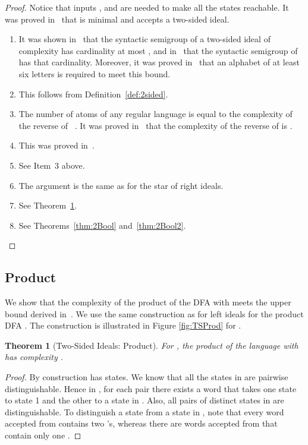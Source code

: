 \documentclass[final]{dmtcs-episciences}
\newcommand{\be}{\begin{enumerate}}
\newcommand{\ee}{\end{enumerate}}
\newtheorem{theorem}{Theorem}
\theoremstyle{definition}
\theoremstyle{remark}
\begin{document}
\begin{proof}
Notice that inputs ,  and  are needed to make all the states reachable.
It was proved in~\cite{BrYe11} that   is minimal and accepts a two-sided ideal.
\be
\item
It was shown in~\cite{BrSz14} that the syntactic semigroup of a two-sided ideal of complexity  has cardinality at most , and
in~\cite{BrYe11} that the syntactic semigroup of  has that cardinality. 
Moreover, it was proved in~\cite{BSY15} that an alphabet of at least six letters is required to meet this bound. 
\item
This follows from Definition~\ref{def:2sided}.
\item
The number of atoms of any regular language  is equal to the complexity of the reverse of ~\cite{BrTa13}. It was proved in~\cite{BrYe11} that the complexity of the reverse of  is .
\item
This was proved in~\cite{BrDa15}.

\item
See Item~3 above.
\item
The argument is the same as for the star of right ideals.
\item
See Theorem~\ref{thm:2Prod}.
\item
See Theorems~\ref{thm:2Bool} and~\ref{thm:2Bool2}.
\ee
\end{proof}

\subsection{Product}
\label{ssec:product_2sided}
We show that the complexity of the product of the DFA  with  
meets the upper bound  derived in~\cite{BJL13}. We use the same construction as for left ideals for the product DFA . 
The construction is illustrated in Figure \ref{fig:TSProd} for .


\begin{theorem} [Two-Sided Ideals: Product]
\label{thm:2Prod}
For , the product of the language  with  has complexity .
\end{theorem}
\begin{proof}
By construction  has  states.
We know that all the states in  are pairwise distinguishable. Hence in , for each pair there exists a word that takes one state to state 1 and the other to a state in . Also, all pairs of distinct states in  are distinguishable. 
To distinguish a state  from a state  in , note that every word accepted from  contains two 's, whereas there are words accepted from  that contain only one .

\end{proof}
\end{document}
